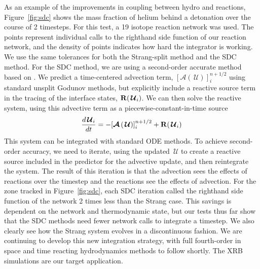\documentclass[a4paper]{jpconf}
\newcommand{\Uc}{{\,\bm{\mathcal{U}}}}
\newcommand{\Adv}[1]{{\left [\boldsymbol{\mathcal{A}} \left(#1\right)\right]}}
\begin{document}
As an example of the improvements in coupling between hydro
and reactions, Figure~\ref{fig:sdc} shows the mass fraction of helium
behind a detonation over the course of 2 timesteps.  For this test,
a 19 isotope reaction network was used.  The points
represent individual calls to the righthand side function of our
reaction network, and the density of
points indicates how hard the integrator is working.  We use the same
tolerances for both the Strang-split method and the SDC method.  For
the SDC method, we are using a second-order accurate method based on
\cite{SDC-old}.  We predict a time-centered advection term,
$\Adv{\Uc}^{n+1/2}_i$ using standard unsplit Godunov methods, but
explicitly include a reactive source term in the tracing of the
interface states, ${\bf R}(\Uc_i)$.  We can then solve the reactive
system, using this advective term as a piecewise-constant-in-time
source
\begin{equation}
\label{eq:syst}
\frac{d{\Uc_i}}{dt} = -\Adv{\Uc}^{n+1/2}_i + {\bf R}(\Uc_i)
\end{equation}
This system can be integrated with standard ODE methods.  To achieve
second-order accuracy, we need to iterate, using the updated $\Uc$ to
create a reactive source included in the predictor for the advective
update, and then reintegrate the system.  The result of this iteration
is that the advection sees the effects of reactions over the timestep
and the reactions see the effects of advection.  For the zone tracked
in Figure~\ref{fig:sdc}, each SDC iteration called the righthand side
function of the network 2 times less than the Strang case.  This
savings is dependent on the network and thermodynamic state, but our
tests thus far show that the SDC methods need fewer network calls to
integrate a timestep.  We also clearly see how the Strang system
evolves in a discontinuous fashion.  We are continuing to develop this
new integration strategy, with full fourth-order in space and time
reacting hydrodynamics methods to follow shortly.  The XRB simulations
are our target application.
\end{document}
